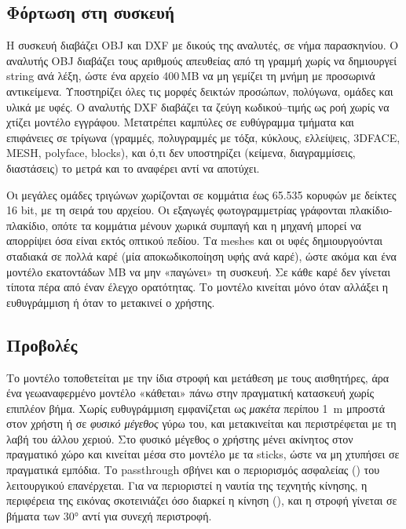 \subsection{Φόρτωση στη συσκευή}
Η συσκευή διαβάζει OBJ και DXF με δικούς της αναλυτές, σε νήμα παρασκηνίου. Ο αναλυτής OBJ διαβάζει τους αριθμούς απευθείας από τη γραμμή χωρίς να δημιουργεί string ανά λέξη, ώστε ένα αρχείο 400\,MB να μη γεμίζει τη μνήμη με προσωρινά αντικείμενα. Υποστηρίζει όλες τις μορφές δεικτών προσώπων, πολύγωνα, ομάδες και υλικά με υφές. Ο αναλυτής DXF διαβάζει τα ζεύγη κωδικού--τιμής ως ροή χωρίς να χτίζει μοντέλο εγγράφου. Μετατρέπει καμπύλες σε ευθύγραμμα τμήματα και επιφάνειες σε τρίγωνα (γραμμές, πολυγραμμές με τόξα, κύκλους, ελλείψεις, 3DFACE, MESH, polyface, blocks), και ό,τι δεν υποστηρίζει (κείμενα, διαγραμμίσεις, διαστάσεις) το μετρά και το αναφέρει αντί να αποτύχει.

Οι μεγάλες ομάδες τριγώνων χωρίζονται σε κομμάτια έως 65.535 κορυφών με δείκτες 16 bit, με τη σειρά του αρχείου. Οι εξαγωγές φωτογραμμετρίας γράφονται πλακίδιο-πλακίδιο, οπότε τα κομμάτια μένουν χωρικά συμπαγή και η μηχανή μπορεί να απορρίψει όσα είναι εκτός οπτικού πεδίου. Τα meshes και οι υφές δημιουργούνται σταδιακά σε πολλά καρέ (μία αποκωδικοποίηση υφής ανά καρέ), ώστε ακόμα και ένα μοντέλο εκατοντάδων MB να μην «παγώνει» τη συσκευή. Σε κάθε καρέ δεν γίνεται τίποτα πέρα από έναν έλεγχο ορατότητας. Το μοντέλο κινείται μόνο όταν αλλάξει η ευθυγράμμιση ή όταν το μετακινεί ο χρήστης.


\subsection{Προβολές}
Το μοντέλο τοποθετείται με την ίδια στροφή και μετάθεση με τους αισθητήρες, άρα ένα γεωαναφερμένο μοντέλο «κάθεται» πάνω στην πραγματική κατασκευή χωρίς επιπλέον βήμα. Χωρίς ευθυγράμμιση εμφανίζεται ως \emph{μακέτα} περίπου \SI{1}{m} μπροστά στον χρήστη ή σε \emph{φυσικό μέγεθος} γύρω του, και μετακινείται και περιστρέφεται με τη λαβή του άλλου χεριού. Στο φυσικό μέγεθος ο χρήστης μένει ακίνητος στον πραγματικό χώρο και κινείται μέσα στο μοντέλο με τα sticks, ώστε να μη χτυπήσει σε πραγματικά εμπόδια. Το passthrough σβήνει και ο περιορισμός ασφαλείας () του λειτουργικού επανέρχεται. Για να περιοριστεί η ναυτία της τεχνητής κίνησης, η περιφέρεια της εικόνας σκοτεινιάζει όσο διαρκεί η κίνηση (), και η στροφή γίνεται σε βήματα των 30° αντί για συνεχή περιστροφή.

